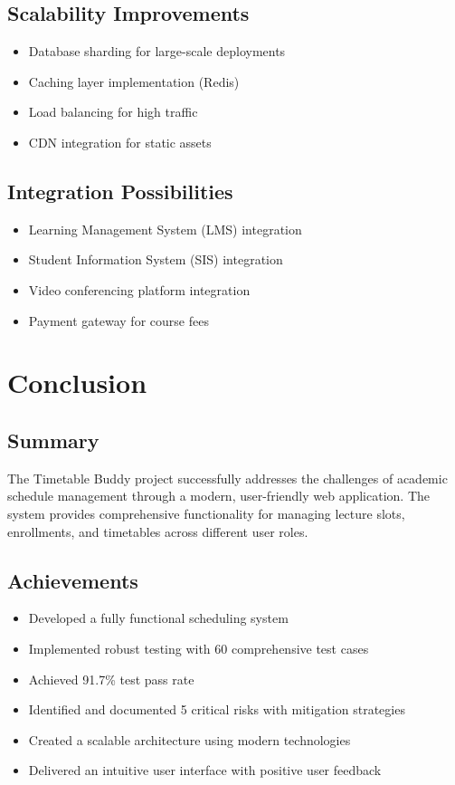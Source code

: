\documentclass[12pt,a4paper]{report}
\begin{document}
\section{Scalability Improvements}
\begin{itemize}[leftmargin=*]
    \item Database sharding for large-scale deployments
    \item Caching layer implementation (Redis)
    \item Load balancing for high traffic
    \item CDN integration for static assets
\end{itemize}

\section{Integration Possibilities}
\begin{itemize}[leftmargin=*]
    \item Learning Management System (LMS) integration
    \item Student Information System (SIS) integration
    \item Video conferencing platform integration
    \item Payment gateway for course fees
\end{itemize}

\chapter{Conclusion}

\section{Summary}
The Timetable Buddy project successfully addresses the challenges of academic schedule management through a modern, user-friendly web application. The system provides comprehensive functionality for managing lecture slots, enrollments, and timetables across different user roles.

\section{Achievements}
\begin{itemize}[leftmargin=*]
    \item Developed a fully functional scheduling system
    \item Implemented robust testing with 60 comprehensive test cases
    \item Achieved 91.7\% test pass rate
    \item Identified and documented 5 critical risks with mitigation strategies
    \item Created a scalable architecture using modern technologies
    \item Delivered an intuitive user interface with positive user feedback
\end{itemize}
\end{document}
